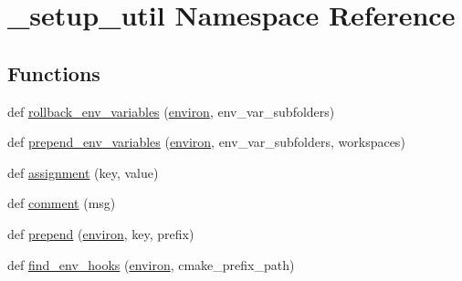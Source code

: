 \hypertarget{namespace__setup__util}{}\section{\+\_\+setup\+\_\+util Namespace Reference}
\label{namespace__setup__util}
\subsection*{Functions}
\begin{DoxyCompactItemize}
\item 
def \hyperlink{namespace__setup__util_af3030db6102b5aa35cd354a2fb6cca03}{rollback\+\_\+env\+\_\+variables} (\hyperlink{namespace__setup__util_a9a935bdd9ee1aa0327161025bb18c136}{environ}, env\+\_\+var\+\_\+subfolders)
\item 
def \hyperlink{namespace__setup__util_a832417d18b85bd1d276a87547e86f860}{prepend\+\_\+env\+\_\+variables} (\hyperlink{namespace__setup__util_a9a935bdd9ee1aa0327161025bb18c136}{environ}, env\+\_\+var\+\_\+subfolders, workspaces)
\item 
def \hyperlink{namespace__setup__util_ad56c24837fa4eddc63c03fbc7035628f}{assignment} (key, value)
\item 
def \hyperlink{namespace__setup__util_abe8c95c4cfe8b1374dacd5f91d984353}{comment} (msg)
\item 
def \hyperlink{namespace__setup__util_ae78d86b2c4279f5b8b1acaa146c35802}{prepend} (\hyperlink{namespace__setup__util_a9a935bdd9ee1aa0327161025bb18c136}{environ}, key, prefix)
\item 
def \hyperlink{namespace__setup__util_a73de35ca77f260af6691470342ab49ce}{find\+\_\+env\+\_\+hooks} (\hyperlink{namespace__setup__util_a9a935bdd9ee1aa0327161025bb18c136}{environ}, cmake\+\_\+prefix\+\_\+path)
\end{DoxyCompactItemize}
